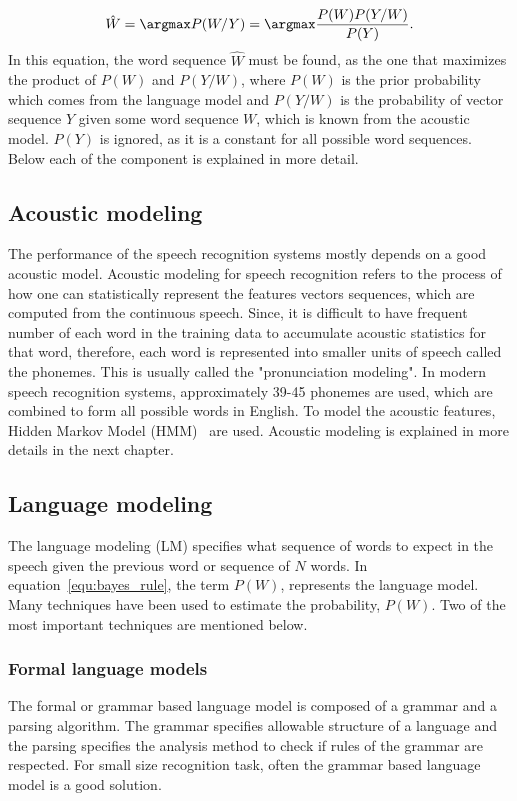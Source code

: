 \documentclass[a4paper, 12pt]{article}
\begin{document}
\begin{equation}
\label{equ:bayes_rule}
\hat{W} = \argmax P(W/Y) = \argmax\frac{P(W)P(Y/W)}{P(Y)}.
\end{equation}
In this equation, the word sequence $\hat{W}$ must be found, as the one that maximizes the product of $P(W)$ and $P(Y/W)$, where $P(W)$ is the prior probability which comes from the language model and $P(Y/W)$ is the probability of vector sequence $Y$ given some word sequence $W$, which is known from the acoustic model. $P(Y)$ is ignored, as it is a constant for all possible word sequences. Below each of the component is explained in more detail.
\subsection{Acoustic modeling}
The performance of the speech recognition systems mostly depends on a good acoustic model. Acoustic modeling for speech recognition refers to the process of how one can statistically represent the features vectors sequences, which are computed from the continuous speech. Since, it is difficult to have frequent number of each word in the training data to accumulate acoustic statistics for that word, therefore, each word is represented into smaller units of speech called the phonemes. This is usually called the  "pronunciation modeling". In modern speech recognition systems, approximately 39-45 phonemes are used, which are combined to form all possible words in English. To model the acoustic features, Hidden Markov Model (HMM)~\cite{hmm_for_SR} are used. Acoustic modeling is explained in more details in the next chapter.

\subsection{Language modeling}
The language modeling (LM) specifies what sequence of words to expect in the speech given the previous word or sequence of $N$ words. In equation~\ref{equ:bayes_rule}, the term $P(W)$, represents the language model. Many techniques have been used to estimate the probability, $P(W)$. Two of the most important techniques are mentioned below.
\subsubsection{Formal language models} 
\label{sec:gramar_based_lm}
The formal or grammar based language model is composed of a grammar and a parsing algorithm. The grammar specifies allowable structure of a language and the parsing specifies the analysis method to check if rules of the grammar are respected. For small size recognition task, often the grammar based language model is a good solution. 
\end{document}
